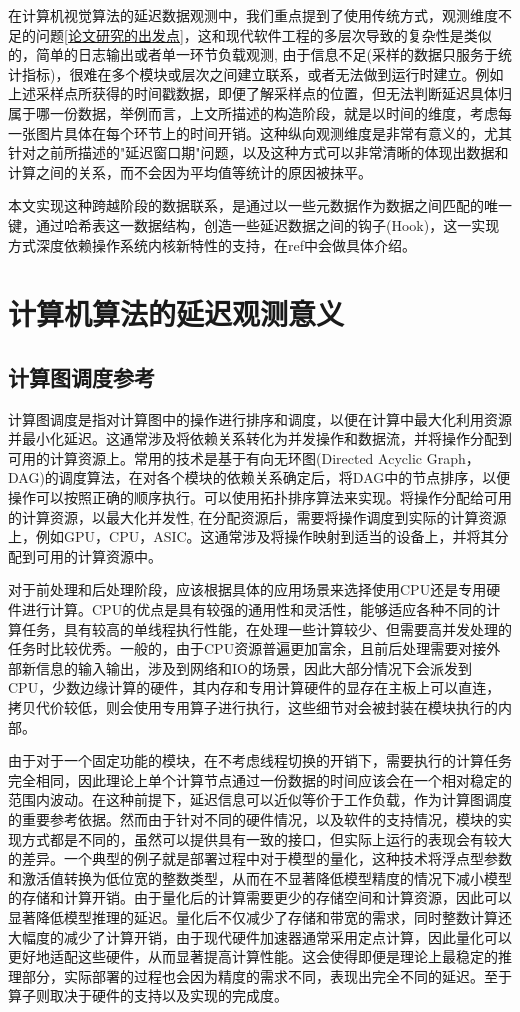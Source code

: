 \documentclass[master]{shtthesis}
\begin{document}
在计算机视觉算法的延迟数据观测中，我们重点提到了使用传统方式，观测维度不足的问题\ref{论文研究的出发点}，这和现代软件工程的多层次导致的复杂性是类似的，简单的日志输出或者单一环节负载观测, 由于信息不足(采样的数据只服务于统计指标)，很难在多个模块或层次之间建立联系，或者无法做到运行时建立。例如上述采样点所获得的时间戳数据，即便了解采样点的位置，但无法判断延迟具体归属于哪一份数据，举例而言，上文所描述的构造阶段，就是以时间的维度，考虑每一张图片具体在每个环节上的时间开销。这种纵向观测维度是非常有意义的，尤其针对之前所描述的"延迟窗口期"问题，以及这种方式可以非常清晰的体现出数据和计算之间的关系，而不会因为平均值等统计的原因被抹平。

本文实现这种跨越阶段的数据联系，是通过以一些元数据作为数据之间匹配的唯一键，通过哈希表这一数据结构，创造一些延迟数据之间的钩子(Hook)，这一实现方式深度依赖操作系统内核新特性的支持，在ref中会做具体介绍。

\section{计算机算法的延迟观测意义}\label{计算机算法的延迟观测意义}
\subsection{计算图调度参考}\label{计算图调度参考}
计算图调度是指对计算图中的操作进行排序和调度，以便在计算中最大化利用资源并最小化延迟。这通常涉及将依赖关系转化为并发操作和数据流，并将操作分配到可用的计算资源上。常用的技术是基于有向无环图(Directed Acyclic Graph，DAG)的调度算法，在对各个模块的依赖关系确定后，将DAG中的节点排序，以便操作可以按照正确的顺序执行。可以使用拓扑排序算法来实现。将操作分配给可用的计算资源，以最大化并发性, 在分配资源后，需要将操作调度到实际的计算资源上，例如GPU，CPU，ASIC。这通常涉及将操作映射到适当的设备上，并将其分配到可用的计算资源中。

对于前处理和后处理阶段，应该根据具体的应用场景来选择使用CPU还是专用硬件进行计算。CPU的优点是具有较强的通用性和灵活性，能够适应各种不同的计算任务，具有较高的单线程执行性能，在处理一些计算较少、但需要高并发处理的任务时比较优秀。一般的，由于CPU资源普遍更加富余，且前后处理需要对接外部新信息的输入输出，涉及到网络和IO的场景，因此大部分情况下会派发到CPU，少数边缘计算的硬件，其内存和专用计算硬件的显存在主板上可以直连，拷贝代价较低，则会使用专用算子进行执行，这些细节对会被封装在模块执行的内部。

由于对于一个固定功能的模块，在不考虑线程切换的开销下，需要执行的计算任务完全相同，因此理论上单个计算节点通过一份数据的时间应该会在一个相对稳定的范围内波动。在这种前提下，延迟信息可以近似等价于工作负载，作为计算图调度的重要参考依据。然而由于针对不同的硬件情况，以及软件的支持情况，模块的实现方式都是不同的，虽然可以提供具有一致的接口，但实际上运行的表现会有较大的差异。一个典型的例子就是部署过程中对于模型的量化，这种技术将浮点型参数和激活值转换为低位宽的整数类型，从而在不显著降低模型精度的情况下减小模型的存储和计算开销。由于量化后的计算需要更少的存储空间和计算资源，因此可以显著降低模型推理的延迟。量化后不仅减少了存储和带宽的需求，同时整数计算还大幅度的减少了计算开销，由于现代硬件加速器通常采用定点计算，因此量化可以更好地适配这些硬件，从而显著提高计算性能。这会使得即便是理论上最稳定的推理部分，实际部署的过程也会因为精度的需求不同，表现出完全不同的延迟。至于算子则取决于硬件的支持以及实现的完成度。
\end{document}
